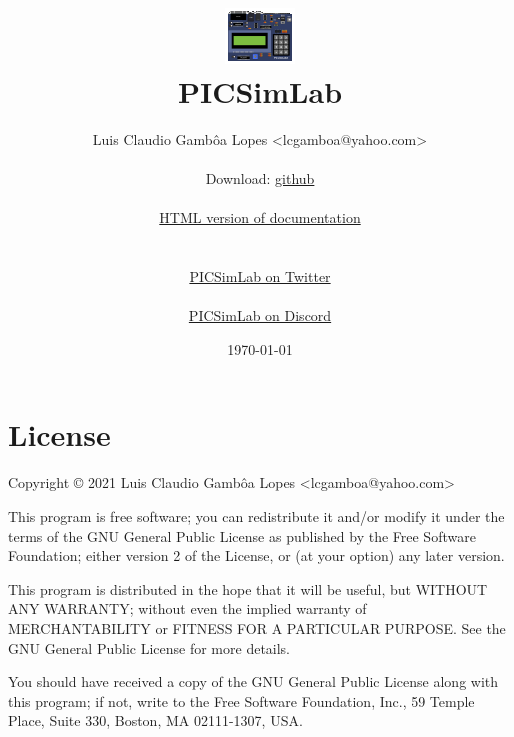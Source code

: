 \documentclass[oneside]{book}
\title{ ~~\\ ~~\\ ~~\\ \includegraphics[scale=1.0]{img/logo.png} \\ PICSimLab \PNversion}
\author{Luis Claudio Gambôa Lopes  <lcgamboa@yahoo.com>\\
\\
{\centering Download: \href{https://github.com/lcgamboa/picsimlab}{github}}
\\
\ifpdf
\\
{\centering \href{https://lcgamboa.github.io/picsimlab\_docs/\PNversion/}{HTML version of documentation}} 
\else
\\
{\centering \hrefb{picsimlab.pdf}{PDF version of documentation}} 
\fi
\\
\\
{\centering \href{https://twitter.com/PICSimLab}{PICSimLab on Twitter}}
\\
\\
{\centering \href{https://discord.gg/fMT8szFYq7}{PICSimLab on Discord}}
}
\date{\today}
\begin{document}
\def\hrefb#1#2{\href{#1}{#2}}
\def\hrefr#1#2{\href{run:#1}{#2}}


\hypersetup{pageanchor=false}
\maketitle
\hypersetup{pageanchor=true}

\ifdefined\HCode\else
\tableofcontents
\fi













\chapter{License}

Copyright © 2021 Luis Claudio Gambôa Lopes <lcgamboa@yahoo.com>

This program is free software; you can redistribute it and/or modify
it under the terms of the GNU General Public License as published by
the Free Software Foundation; either version 2 of the License, or
(at your option) any later version.

This program is distributed in the hope that it will be useful,
but WITHOUT ANY WARRANTY; without even the implied warranty of
MERCHANTABILITY or FITNESS FOR A PARTICULAR PURPOSE. See the
GNU General Public License for more details.

You should have received a copy of the GNU General Public License
along with this program; if not, write to the Free Software
Foundation, Inc., 59 Temple Place, Suite 330,
Boston, MA 02111-1307, USA.

\appendix



\end{document}
